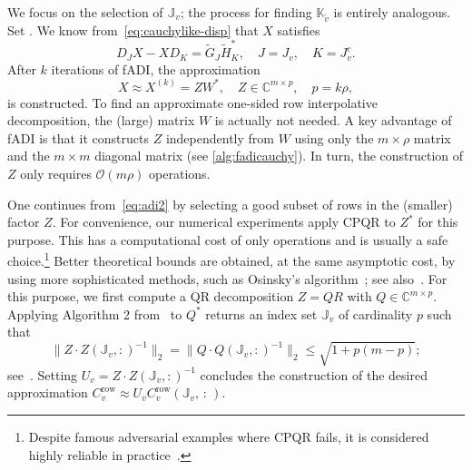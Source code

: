 \documentclass[final,reqno,onefignum,onetabnum]{siamart190516}
\newcommand{\C}{\mathbb{C}}
\begin{document}
We focus on the selection of $\mathbb{J}_v$; the process for finding $\mathbb{K}_{\tilde v}$ is entirely analogous.
Set .
We know from~\eqref{eq:cauchylike-disp} that $X$ satisfies \[
D_JX - XD_K = \widetilde G_J \widetilde H_K^*, \quad J = J_v, \quad K = J_v^{c}.
\]
After $k$ iterations of fADI, the approximation \begin{equation}\label{eq:adi2}
X \approx X^{(k)} = ZW^*, \quad  Z  \in \mathbb{C}^{m \times p }, \quad p = k \rho,
                                                \end{equation}
is constructed. To find an approximate one-sided row interpolative decomposition, the (large) matrix $W$ is actually not needed. A key advantage of fADI is that it constructs $Z$ independently from $W$ using only the $m \times \rho$ matrix  and the $m \times m$ diagonal matrix  (see \cref{alg:fadicauchy}). In turn, the construction of $Z$ only requires $\mathcal{O}(m \rho)$ operations.


One continues from~\eqref{eq:adi2} by selecting a good subset of rows in the (smaller) factor $Z$. For convenience, 
our numerical experiments apply CPQR to $Z^*$ for this purpose. This has a computational cost of only  operations and is usually a safe choice.\footnote{Despite famous adversarial examples where CPQR fails, it is considered highly reliable in practice~\cite{gu1996efficient}.} Better theoretical bounds are obtained, at the same asymptotic cost, by using more sophisticated methods, such as Osinsky's algorithm~\cite{Osinsky2023}; see also~\cite{Cortinovis2024}. For this purpose, we first compute a QR decomposition $Z = QR$ with $Q \in \C^{m\times p}$. Applying Algorithm 2 from~\cite{Osinsky2023} to $Q^*$ returns an index set
$\mathbb J_v$ of cardinality $p$ such that
\begin{equation} \label{eq:osinsky}
 \|Z \cdot Z(\mathbb J_v,:)^{-1} \|_2 = 
 \|Q \cdot Q(\mathbb J_v,:)^{-1} \|_2 \le \sqrt{1+p(m-p)};
\end{equation}
see~\cite[Thm. 5]{Osinsky2023}. Setting $U_v = Z \cdot Z(\mathbb{J}_v,:)^{-1}$ concludes the construction of the desired
approximation $C_v^{\mathrm{row}} \approx U_v  C_v^{\mathrm{row}}(\mathbb{J}_v, \, :\,)$.
\end{document}
